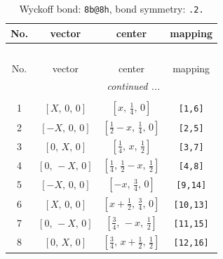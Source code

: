 \documentclass[fleqn,8pt]{jsarticle}
\begin{document}
\renewcommand{\arraystretch}{1.2}
\begin{longtable}{cccc}
\caption{Wyckoff bond: {\tt 8b@8h}, bond symmetry: {\tt .2.}}
 \\
 \hline \hline
No. & vector & center & mapping \\ \hline \endfirsthead

\multicolumn{3}{l}{\tablename\ \thetable{}} \\
 \hline \hline
No. & vector & center & mapping \\ \hline \endhead

 \hline \hline
\multicolumn{3}{r}{\footnotesize\it continued ...} \\ \endfoot

 \hline \hline
\multicolumn{3}{r}{} \\ \endlastfoot

1 & $\left[ X,\, 0,\, 0 \right]$ & $\left[ x,\, \frac{1}{4},\, 0 \right]$ & {\tt [1,6]} \\ \hline
2 & $\left[ - X,\, 0,\, 0 \right]$ & $\left[ \frac{1}{2} - x,\, \frac{1}{4},\, 0 \right]$ & {\tt [2,5]} \\ \hline
3 & $\left[ 0,\, X,\, 0 \right]$ & $\left[ \frac{1}{4},\, x,\, \frac{1}{2} \right]$ & {\tt [3,7]} \\ \hline
4 & $\left[ 0,\, - X,\, 0 \right]$ & $\left[ \frac{1}{4},\, \frac{1}{2} - x,\, \frac{1}{2} \right]$ & {\tt [4,8]} \\ \hline
5 & $\left[ - X,\, 0,\, 0 \right]$ & $\left[ - x,\, \frac{3}{4},\, 0 \right]$ & {\tt [9,14]} \\ \hline
6 & $\left[ X,\, 0,\, 0 \right]$ & $\left[ x + \frac{1}{2},\, \frac{3}{4},\, 0 \right]$ & {\tt [10,13]} \\ \hline
7 & $\left[ 0,\, - X,\, 0 \right]$ & $\left[ \frac{3}{4},\, - x,\, \frac{1}{2} \right]$ & {\tt [11,15]} \\ \hline
8 & $\left[ 0,\, X,\, 0 \right]$ & $\left[ \frac{3}{4},\, x + \frac{1}{2},\, \frac{1}{2} \right]$ & {\tt [12,16]} \\
\end{longtable}
\renewcommand{\arraystretch}{1.2}
\end{document}
